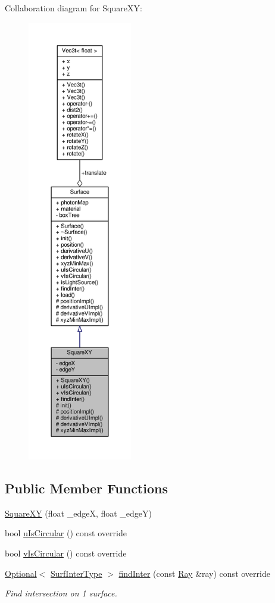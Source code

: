 Collaboration diagram for Square\+XY\+:
\nopagebreak
\begin{figure}[H]
\begin{center}
\leavevmode
\includegraphics[height=550pt]{classSquareXY__coll__graph}
\end{center}
\end{figure}
\subsection*{Public Member Functions}
\begin{DoxyCompactItemize}
\item 
\hyperlink{classSquareXY_abeafd51f0c01d2c479f0d87ccb66567e}{Square\+XY} (float \+\_\+edgeX, float \+\_\+edgeY)
\item 
bool \hyperlink{classSquareXY_a060cba6cee229bbe185bd59fbc49c461}{u\+Is\+Circular} () const override
\item 
bool \hyperlink{classSquareXY_aeebe33da47d345225afba03b8aa110dc}{v\+Is\+Circular} () const override
\item 
\hyperlink{classOptional}{Optional}$<$ \hyperlink{structSurfInterType}{Surf\+Inter\+Type} $>$ \hyperlink{classSquareXY_a33545d952933da0107ca9d9a6c8301ff}{find\+Inter} (const \hyperlink{structRay}{Ray} \&ray) const override
\begin{DoxyCompactList}\small\item\em Find intersection on 1 surface. \end{DoxyCompactList}\end{DoxyCompactItemize}
